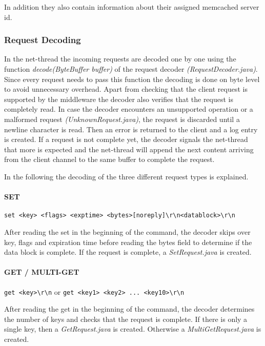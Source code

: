 \documentclass[report.tex]{subfiles}
\begin{document}
In addition they also contain information about their assigned memcached server id.

\subsubsection{Request Decoding}\label{request-decoding}
In the net-thread the incoming requests are decoded one by one using the function \emph{decode(ByteBuffer buffer)} of the request decoder \emph{(RequestDecoder.java)}.
Since every request needs to pass this function the decoding is done on byte level to avoid unnecessary overhead.
Apart from checking that the client request is supported by the middleware the decoder also verifies that the request is completely read. In case the decoder encounters an unsupported operation or a malformed request \emph{(UnknownRequest.java)}, the request is discarded until a newline character is read. Then an error is returned to the client and a log entry is created. If a request is not complete yet, the decoder signals the net-thread that more is expected and the net-thread will append the next content arriving from the client channel to the same buffer to complete the request.

In the following the decoding of the three different request types is explained. 

\paragraph{SET} \texttt{set <key> <flags> <exptime> <bytes>[noreply]\textbackslash r\textbackslash n<datablock>\textbackslash r\textbackslash n} 

After reading the set in the beginning of the command, the decoder skips over key, flags and expiration time before reading the bytes field to determine if the data block is complete. If the request is complete, a \emph{SetRequest.java} is created.

\paragraph{GET / MULTI-GET} \texttt{get <key>\textbackslash r\textbackslash n} or \texttt{get <key1> <key2> ... <key10>\textbackslash r\textbackslash n}

After reading the get in the beginning of the command, the decoder determines the number of keys and checks that the request is complete. If there is only a single key, then a \emph{GetRequest.java} is created. Otherwise a \emph{MultiGetRequest.java} is created.
\end{document}
